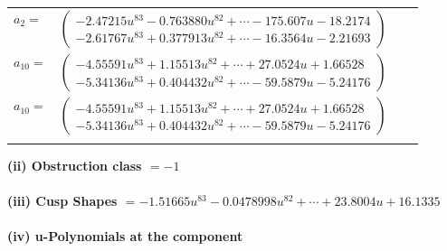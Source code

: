 \documentclass[1p]{elsarticle_modified}
\theoremstyle{definition}
\begin{document}
\begin{tabular}{m{7pt} m{180pt} m{7pt} m{180pt} }
\flushright $a_{2}=$&$\begin{pmatrix}-2.47215 u^{83}-0.763880 u^{82}+\cdots-175.607 u-18.2174\\-2.61767 u^{83}+0.377913 u^{82}+\cdots-16.3564 u-2.21693\end{pmatrix}$ \\
\flushright $a_{10}=$&$\begin{pmatrix}-4.55591 u^{83}+1.15513 u^{82}+\cdots+27.0524 u+1.66528\\-5.34136 u^{83}+0.404432 u^{82}+\cdots-59.5879 u-5.24176\end{pmatrix}$\\ \flushright $a_{10}=$&$\begin{pmatrix}-4.55591 u^{83}+1.15513 u^{82}+\cdots+27.0524 u+1.66528\\-5.34136 u^{83}+0.404432 u^{82}+\cdots-59.5879 u-5.24176\end{pmatrix}$\\&\end{tabular}
\flushleft \textbf{(ii) Obstruction class $= -1$}\\~\\
\flushleft \textbf{(iii) Cusp Shapes $= -1.51665 u^{83}-0.0478998 u^{82}+\cdots+23.8004 u+16.1335$}\\~\\
\newpage\renewcommand{\arraystretch}{1}
\flushleft \textbf{(iv) u-Polynomials at the component}\newline \\
\end{document}
